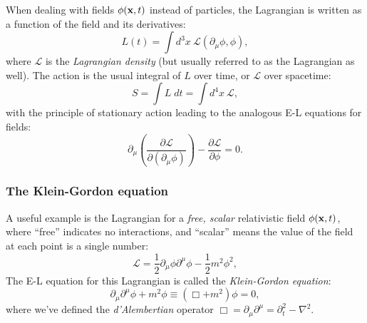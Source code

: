 When dealing with fields $\phi(\mathbf{x}, t)$ instead of particles, the Lagrangian is written as a function of the field and its derivatives:
\begin{equation}
	\label{eq:01_qft_field_lagrangian_density}
	L(t) = \int d^3x\ \mathcal{L}(\partial_\mu\phi, \phi),
\end{equation}
where $\mathcal{L}$ is the \textit{Lagrangian density} (but usually referred to as the Lagrangian as well).
The action is the usual integral of $L$ over time, or $\mathcal{L}$ over spacetime:
\begin{equation}
	\label{eq:01_qft_field_action}
	S = \int L\;dt = \int d^4x\ \mathcal{L},
\end{equation}
with the principle of stationary action leading to the analogous E-L equations for fields:
\begin{equation}
	\label{eq:01_qft_field_euler_lagrange}
	\partial_\mu\left(\frac{\partial\mathcal{L}}{\partial(\partial_\mu\phi)}\right) - \frac{\partial\mathcal{L}}{\partial\phi} = 0.
\end{equation}

\subsubsection{The Klein-Gordon equation}

A useful example is the Lagrangian for a \textit{free, scalar} relativistic field $\phi(\mathbf{x}, t)$, where ``free'' indicates no interactions, and ``scalar'' means the value of the field at each point is a single number:
\begin{equation}
	\label{eq:01_qft_field_kg_lagrangian}
	\mathcal{L} = \frac{1}{2}\partial_\mu\phi\partial^\mu\phi - \frac{1}{2}m^2\phi^2,
\end{equation}
The E-L equation for this Lagrangian is called the \textit{Klein-Gordon equation}:
\begin{equation}
	\label{eq:01_qft_field_kg_equation}
	\partial_\mu\partial^\mu\phi + m^2\phi \equiv (\Box + m^2)\phi = 0,
\end{equation}
where we've defined the \textit{d'Alembertian} operator $\Box = \partial_\mu\partial^\mu = \partial_t^2 - \nabla^2$.	


